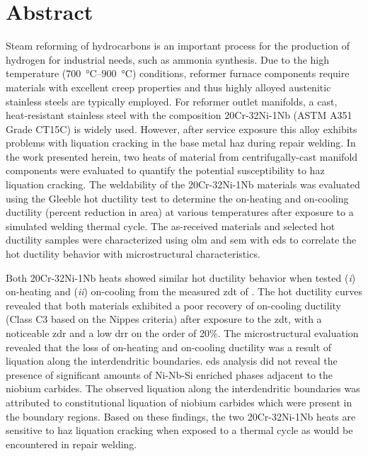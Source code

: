 \chapter*{Abstract}\label{ch:abstract}
Steam reforming of hydrocarbons is an important process for the production of hydrogen for industrial needs, such as ammonia synthesis. Due to the high temperature (\SIrange[range-phrase=--]{700}{900}{\degreeCelsius}) conditions, reformer furnace components require materials with excellent creep properties and thus highly alloyed austenitic stainless steels are typically employed. For reformer outlet manifolds, a cast, heat-resistant stainless steel with the composition 20Cr-32Ni-1Nb (ASTM A351 Grade CT15C) is widely used. However, after service exposure this alloy exhibits problems with liquation cracking in the base metal \gls{haz} during repair welding. In the work presented herein, two heats of material from centrifugally-cast manifold components were evaluated to quantify the potential susceptibility to \gls{haz} liquation cracking. The weldability of the 20Cr-32Ni-1Nb materials was evaluated using the Gleeble\texttrademark{} hot ductility test to determine the on-heating and on-cooling ductility (percent reduction in area) at various temperatures after exposure to a simulated welding thermal cycle. The as-received materials and selected hot ductility samples were characterized using \gls{olm} and \gls{sem} with \gls{eds} to correlate the hot ductility behavior with microstructural characteristics.

Both 20Cr-32Ni-1Nb heats showed similar hot ductility behavior when tested (\emph{i}) on-heating and (\emph{ii}) on-cooling from the measured \gls{zdt} of . The hot ductility curves revealed that both materials exhibited a poor recovery of on-cooling ductility (Class C3 based on the Nippes criteria) after exposure to the \gls{zdt}, with a noticeable \gls{zdr} and a low \gls{drr} on the order of 20\%. The microstructural evaluation revealed that the loss of on-heating and on-cooling ductility was a result of liquation along the interdendritic boundaries. \gls{eds} analysis did not reveal the presence of significant amounts of Ni-Nb-Si enriched phases adjacent to the niobium carbides. The observed liquation along the interdendritic boundaries was attributed to constitutional liquation of niobium carbides which were present in the boundary regions. Based on these findings, the two 20Cr-32Ni-1Nb heats are sensitive to \gls{haz} liquation cracking when exposed to a thermal cycle as would be encountered in repair welding.




